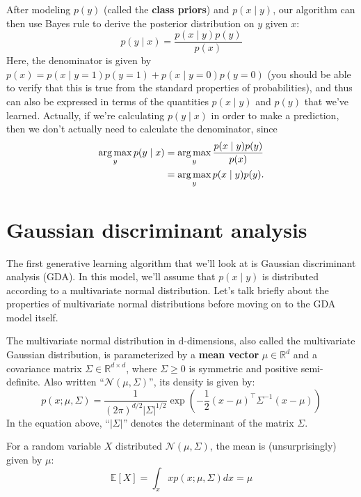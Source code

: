 After modeling $p(y)$ (called the \textbf{class priors}) and $p(x \mid y)$, our algorithm
can then use Bayes rule to derive the posterior distribution on $y$ given $x$:
\begin{equation}
    p(y \mid x) = \frac{p(x \mid y)p(y)}{p(x)}    
\end{equation}
Here, the denominator is given by $p(x) = p(x \mid y = 1)p(y = 1) + p(x \mid y =
0)p(y = 0)$ (you should be able to verify that this is true from the standard
properties of probabilities), and thus can also be expressed in terms of the
quantities $p(x \mid y)$ and $p(y)$ that we've learned. Actually, if we're calculating %
$p(y \mid x)$ in order to make a prediction, then we don't actually need to calculate
the denominator, since
\begin{align*}
    \argmax_y p(y \mid x) &= \argmax_y \frac{p(x \mid y)p(y)}{p(x)}\\
                          &= \argmax_y p(x \mid y)p(y).
\end{align*}

{\let\cleardoublepage\relax \chapter{Gaussian discriminant analysis}}
The first generative learning algorithm that we'll look at is Gaussian discriminant
analysis (GDA). In this model, we'll assume that $p(x \mid y)$ is distributed
according to a multivariate normal distribution. Let's talk briefly about the
properties of multivariate normal distributions before moving on to the GDA
model itself.

The multivariate normal distribution in d-dimensions, also called the multivariate
Gaussian distribution, is parameterized by a \textbf{mean vector} $\mu \in \mathbb{R}^d$
and a covariance matrix $\Sigma \in \mathbb{R}^{d \times d}$, where $\Sigma \ge 0$ is symmetric and positive
semi-definite. Also written ``$\mathcal N(\mu,\Sigma)$'', its density is given by:
\begin{equation}
p(x; \mu,\Sigma) = \frac{1}{(2\pi)^{d/2} |\Sigma|^{1/2}} \exp\left( -\frac{1}{2}(x - \mu)^\top \Sigma^{-1}(x - \mu) \right)
\end{equation}
In the equation above, ``$|\Sigma|$'' denotes the determinant of the matrix $\Sigma$.

For a random variable $X$ distributed $\mathcal N(\mu,\Sigma)$, the mean is (unsurprisingly)
given by $\mu$:
\begin{equation}
    \mathbb{E}[X] = \int_x x p(x; \mu, \Sigma) dx = \mu
\end{equation}


